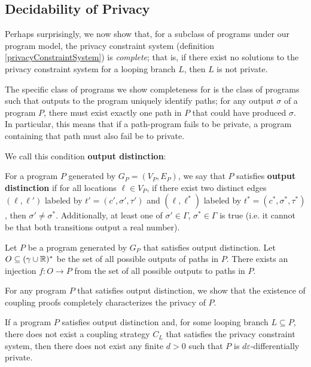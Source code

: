 \subsection{Decidability of Privacy}

Perhaps surprisingly, we now show that, for a subclass of programs under our program model, the privacy constraint system (definition \ref{privacyConstraintSystem}) is \textit{complete}; that is, if there exist no solutions to the privacy constraint system for a looping branch $L$, then $L$ is not private. 

The specific class of programs we show completeness for is the class of programs such that outputs to the program uniquely identify paths; for any output $\sigma$ of a program $P$, there must exist exactly one path in $P$ that could have produced $\sigma$. In particular, this means that if a path-program fails to be private, a program containing that path must also fail be to private. 

We call this condition \textbf{output distinction}:

\begin{defn}\label{outputDistinctionDef}
    For a program $P$ generated by $G_P = (V_P, E_P)$, we say that $P$ satisfies \textbf{output distinction} if for all locations $\ell\in V_P$, if there exist two distinct edges $(\ell, \ell')$ labeled by $t'=(c', \sigma', \tau')$ and $(\ell, \ell^*)$ labeled by $t^* = (c^*, \sigma^*, \tau^*)$, then $\sigma' \neq \sigma^*$. Additionally, at least one of $\sigma'\in \Gamma$, $\sigma^*\in \Gamma$ is true (i.e. it cannot be that both transitions output a real number).
\end{defn}

\begin{prop}
    Let $P$ be a program generated by $G_P$ that satisfies output distinction. Let $O\subseteq (\gamma\cup \mathbb{R})^*$ be the set of all possible outputs of paths in $P$. There exists an injection $f: O\to P$ from the set of all possible outputs to paths in $P$. 
\end{prop}

For any program $P$ that satisfies output distinction, we show that the existence of coupling proofs completely characterizes the privacy of $P$.

\begin{thm}\label{ProgramCounterexampleThm}
    If a program $P$ satisfies output distinction and, for some looping branch $L\subseteq P$, there does not exist a coupling strategy $C_L$ that satisfies the privacy constraint system, then there does not exist any finite $d>0$ such that $P$ is $d\varepsilon$-differentially private.
\end{thm}

